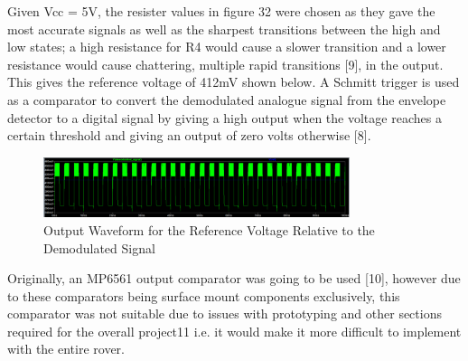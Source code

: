 Given Vcc = 5V, the resister values in figure 32 were chosen as they gave the most accurate signals as well as the sharpest transitions between the high and low states; a high resistance for R4 would cause a slower transition and a lower resistance would cause chattering, multiple rapid transitions [9], in the output. This gives the reference voltage of 412mV shown below.
A Schmitt trigger is used as a comparator to convert the demodulated analogue signal from the envelope detector to a digital signal by giving a high output when the voltage reaches a certain threshold and giving an output of zero volts otherwise [8].
\begin{figure}[h]
    \centering
    \includegraphics[width=0.8\textwidth]{subpages/images/ultra_reference_out.png}
    \caption{Output Waveform for the Reference Voltage Relative to the Demodulated Signal}
    \label{fig:reference_output}
\end{figure}

Originally, an MP6561 output comparator was going to be used [10], however due to these comparators being surface mount components exclusively, this comparator was not suitable due to issues with prototyping and other sections required for the overall project11 i.e. it would make it more difficult to implement with the entire rover.

